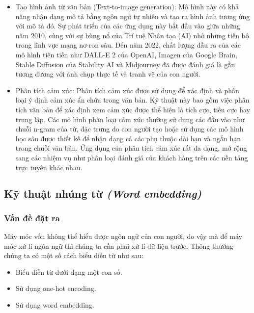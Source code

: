 \begin{itemize}
    \item Tạo hình ảnh từ văn bản (Text-to-image generation): Mô hình này có khả năng nhận dạng mô tả bằng ngôn ngữ tự nhiên và tạo ra hình ảnh tương ứng với mô tả đó. Sự phát triển của các ứng dụng này bắt đầu vào giữa những năm 2010, cùng với sự bùng nổ của Trí tuệ Nhân tạo (AI) nhờ những tiến bộ trong lĩnh vực mạng nơ-ron sâu. Đến năm 2022, chất lượng đầu ra của các mô hình tiên tiến như DALL-E 2 của OpenAI, Imagen của Google Brain, Stable Diffusion của Stability AI và Midjourney đã được đánh giá là gần tương đương với ảnh chụp thực tế và tranh vẽ của con người.
    \item Phân tích cảm xúc: Phân tích cảm xúc được sử dụng để xác định và phân loại ý định cảm xúc ẩn chứa trong văn bản. Kỹ thuật này bao gồm việc phân tích văn bản để xác định xem cảm xúc được thể hiện là tích cực, tiêu cực hay trung lập. Các mô hình phân loại cảm xúc thường sử dụng các đầu vào như chuỗi n-gram của từ, đặc trưng do con người tạo hoặc sử dụng các mô hình học sâu được thiết kế để nhận dạng cả các phụ thuộc dài hạn và ngắn hạn trong chuỗi văn bản. Ứng dụng của phân tích cảm xúc rất đa dạng, mở rộng sang các nhiệm vụ như phân loại đánh giá của khách hàng trên các nền tảng trực tuyến khác nhau.
\end{itemize}



\subsection{Kỹ thuật nhúng từ \textit{(Word embedding)}}
\subsubsection{Vấn đề đặt ra}
Máy móc vốn không thể hiểu được ngôn ngữ của con người, do vậy mà để máy móc xử lí ngôn ngữ thì chúng ta cần phải xử lí dữ liệu trước. Thông thường chúng ta có một số cách biểu diễn từ như sau: \cite{webpage13}
\begin{itemize}
    \item Biểu diễn từ dưới dạng một con số.
    \item Sử dụng one-hot encoding.
    \item Sử dụng word embedding.
\end{itemize}

